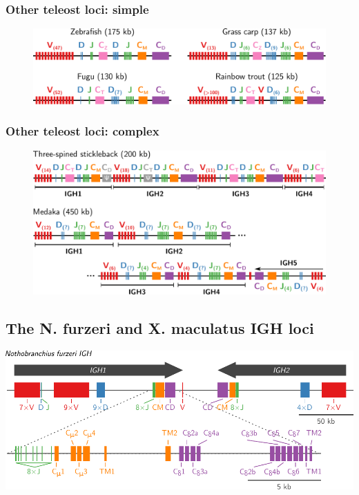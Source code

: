 \documentclass[presentation]{beamer}
\begin{document}
\begin{frame}
\frametitle{Other teleost loci: simple}
\begin{figure}
\centering
\includegraphics[width=\textwidth]{figs/pdf/extra/teleost-loci-simple}
\end{figure}
\end{frame}

\begin{frame}
\frametitle{Other teleost loci: complex}
\begin{figure}
\centering
\includegraphics[width=\textwidth]{figs/pdf/extra/teleost-loci-complex}
\end{figure}
\end{frame}


\subsection{The N. furzeri and X. maculatus IGH loci} %

\begin{frame}
\includegraphics[width=\textwidth]{figs/pdf/extra/locus-map-nfu}
\end{frame}
\end{document}
